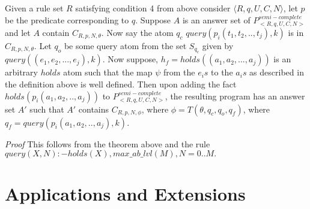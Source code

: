 \documentclass[sigconf]{acmart}
\begin{document}
 
\begin{corollary}\label{addfact}
Given a rule set $R$ satisfying condition 4 from above consider $\langle R,q,U,C,N\rangle$, let $p$ be the predicate corresponding to $q$. Suppose $A$ is an answer set of $P^{semi-complete}_{<R,q,U,C,N>}$ and let $A$ contain $C_{R,p,N,\theta}$. Now say the atom $q_{c}$ $query(p_{i}(t_{1},t_{2},..,t_{j}),k)$ is in $C_{R,p,N,\theta}$. Let $q_{o}$ be some query atom from the set $S_{q_{c}}$ given by $query((e_{1},e_{2},...,e_{j}),k)$. Now suppose, $h_{f}= holds((a_{1},a_{2},...,a_{j}))$ is an arbitrary $holds$ atom such that the map $\psi$ from the $e_{i}s$ to the $a_{i}s$ as described in the definition above is well defined. Then upon adding the fact $holds(p_{i}(a_{1},a_{2},..,a_{j}))$ to $P^{semi-complete}_{<R,q,U,C,N>}$, the resulting program has an answer set $A'$ such that $A'$ contains $C_{R,p,N,\phi}$, where $\phi = T(\theta, q_{c}, q_{o}, q_{f})$, where $q_{f} = query(p_{i}(a_{1},a_{2},..,a_{j}),k)$. 
\end{corollary}
\textit{Proof} This follows from the theorem above and the rule\\ $query(X,N):-holds(X),max\_ab\_lvl(M),N = 0..M.$
\section{Applications and Extensions}\label{sec:applications_extensions}
\end{document}

